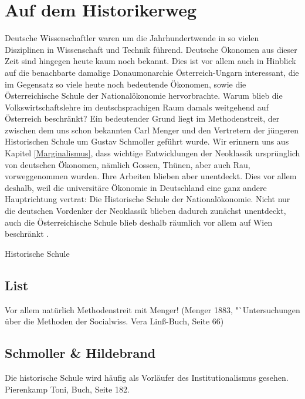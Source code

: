 %
%
%

\chapter{Auf dem Historikerweg}
\label{Historisch}

Deutsche Wissenschaftler waren um die Jahrhundertwende in so vielen Disziplinen in Wissenschaft und Technik führend. Deutsche Ökonomen aus dieser Zeit sind hingegen heute kaum noch bekannt. Dies ist vor allem auch in Hinblick auf die benachbarte damalige Donaumonarchie Österreich-Ungarn interessant, die im Gegensatz so viele heute noch bedeutende Ökonomen, sowie die Österreichische Schule der Nationalökonomie hervorbrachte. Warum blieb die Volkswirtschaftslehre im deutschsprachigen Raum damals weitgehend auf Österreich beschränkt? Ein bedeutender Grund liegt im Methodenstreit, der zwischen dem uns schon bekannten Carl Menger und den Vertretern der jüngeren Historischen Schule um Gustav Schmoller geführt wurde. Wir erinnern uns aus Kapitel \ref{Marginalismus}, dass wichtige Entwicklungen der Neoklassik ursprünglich von deutschen Ökonomen, nämlich Gossen, Thünen, aber auch Rau, vorweggenommen wurden. Ihre Arbeiten blieben aber unentdeckt. Dies vor allem deshalb, weil die universitäre Ökonomie in Deutschland eine ganz andere Hauptrichtung vertrat: Die Historische Schule der Nationalökonomie. Nicht nur die deutschen Vordenker der Neoklassik blieben dadurch zunächst unentdeckt, auch die Österreichische Schule blieb deshalb räumlich vor allem auf Wien beschränkt \parencite[S. 339]{Rosner2012}.


Historische Schule

\section{List}
Vor allem natürlich Methodenstreit mit Menger! (Menger 1883, "`Untersuchungen über die Methoden der Socialwiss. Vera Linß-Buch, Seite 66)

\section{Schmoller \& Hildebrand}

Die historische Schule wird häufig als Vorläufer des Institutionalismus gesehen.
Pierenkamp Toni, Buch, Seite 182.